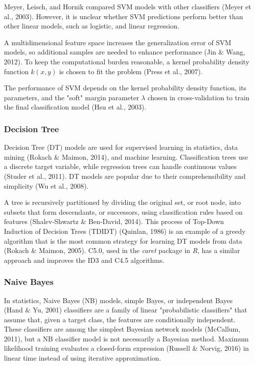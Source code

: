 \documentclass[sn-mathphys-num]{sn-jnl}%
\begin{document}
Meyer, Leisch, and Hornik compared SVM models with other classifiers (Meyer et al., 2003). However, it is unclear whether SVM predictions perform better than other linear models, such as logistic, and linear regression.

A multidimensional feature space increases the generalization error of SVM models, so additional samples are needed to enhance performance (Jin & Wang, 2012). To keep the computational burden reasonable, a kernel probability density function $k(x, y)$ is chosen to fit the problem (Press et al., 2007).

The performance of SVM depends on the kernel probability density function, its parameters, and the "soft" margin parameter $\lambda$ chosen in cross-validation to train the final classification model (Hsu et al., 2003).

\subsubsection{Decision Tree}

Decision Tree (DT) models are used for supervised learning in statistics, data mining (Rokach & Maimon, 2014), and machine learning. Classification trees use a discrete target variable, while regression trees can handle continuous values (Studer et al., 2011). DT models are popular due to their comprehensibility and simplicity (Wu et al., 2008).

A tree is recursively partitioned by dividing the original set, or root node, into subsets that form descendants, or successors, using classification rules based on features (Shalev-Shwartz & Ben-David, 2014). This process of Top-Down Induction of Decision Trees (TDIDT) (Quinlan, 1986) is an example of a greedy algorithm that is the most common strategy for learning DT models from data (Rokach & Maimon, 2005). C5.0, used in the \textit{caret} package in \textit{R}, has a similar approach and improves the ID3 and C4.5 algorithms.

\subsubsection{Naive Bayes}

In statistics, Naive Bayes (NB) models, simple Bayes, or independent Bayes (Hand & Yu, 2001) classifiers are a family of linear "probabilistic classifiers" that assume that, given a target class, the features are conditionally independent. These classifiers are among the simplest Bayesian network models (McCallum, 2011), but a NB classifier model is not necessarily a Bayesian method. Maximum likelihood training evaluates a closed-form expression (Russell & Norvig, 2016) in linear time instead of using iterative approximation.
\end{document}
